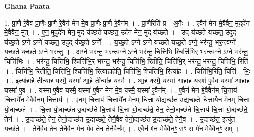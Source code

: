 \documentclass[17pt]{extarticle}
\begin{document}
\textbf{Ghana Paata } \newline

1. प्रा॒णै रे॒वैव प्रा॒णैः प्रा॒णै रे॒वैन॑ मेन मे॒व प्रा॒णैः प्रा॒णै रे॒वैन᳚म् । . प्रा॒णैरिति॑ प्र - अ॒नैः । . ए॒वैन॑ मेन मे॒वैवैन॒ मुदुदे॑न मे॒वैवैन॒ मुत् । . ए॒न॒ मुदुदे॑न मेन॒ मुद् य॑च्छते यच्छत॒ उदे॑न मेन॒ मुद् य॑च्छते । . उद् य॑च्छते यच्छत॒ उदुद् य॑च्छ॒ते ऽग्ने ऽग्ने॑ यच्छत॒ उदुद् य॑च्छ॒ते ऽग्ने᳚ । . य॒च्छ॒ते ऽग्ने ऽग्ने॑ यच्छते यच्छ॒ते ऽग्ने॒ भर॑न्तु॒ भर॒न्त्वग्ने॑ यच्छते यच्छ॒ते ऽग्ने॒ भर॑न्तु । . अग्ने॒ भर॑न्तु॒ भर॒न्त्वग्ने ऽग्ने॒ भर॑न्तु॒ चित्ति॑भि॒ श्चित्ति॑भि॒र् भर॒न्त्वग्ने ऽग्ने॒ भर॑न्तु॒ चित्ति॑भिः । . भर॑न्तु॒ चित्ति॑भि॒ श्चित्ति॑भि॒र् भर॑न्तु॒ भर॑न्तु॒ चित्ति॑भि॒ रितीति॒ चित्ति॑भि॒र् भर॑न्तु॒ भर॑न्तु॒ चित्ति॑भि॒ रिति॑ । . चित्ति॑भि॒ रितीति॒ चित्ति॑भि॒ श्चित्ति॑भि॒ रित्या॑हा॒हेति॒ चित्ति॑भि॒ श्चित्ति॑भि॒ रित्या॑ह । . चित्ति॑भि॒रिति॒ चित्ति॑ - भिः॒ । . इत्या॑हा॒हे तीत्या॑ह॒ यस्मै॒ यस्मा॑ आ॒हे तीत्या॑ह॒ यस्मै᳚ । . आ॒ह॒ यस्मै॒ यस्मा॑ आहाह॒ यस्मा॑ ए॒वैव यस्मा॑ आहाह॒ यस्मा॑ ए॒व । . यस्मा॑ ए॒वैव यस्मै॒ यस्मा॑ ए॒वैन॑ मेन मे॒व यस्मै॒ यस्मा॑ ए॒वैन᳚म् । . ए॒वैन॑ मेन मे॒वैवैन॑म् चि॒त्ताय॑ चि॒त्तायै॑न मे॒वैवैन॑म् चि॒त्ताय॑ । . ए॒न॒म् चि॒त्ताय॑ चि॒त्तायै॑न मेनम् चि॒त्ता यो॒द्यच्छ॑त उ॒द्यच्छ॑ते चि॒त्तायै॑न मेनम् चि॒त्ता यो॒द्यच्छ॑ते । . चि॒त्ता यो॒द्यच्छ॑त उ॒द्यच्छ॑ते चि॒त्ताय॑ चि॒त्ता यो॒द्यच्छ॑ते॒ तेन॒ तेनो॒द्यच्छ॑ते चि॒त्ताय॑ चि॒त्ता यो॒द्यच्छ॑ते॒ तेन॑ । . उ॒द्यच्छ॑ते॒ तेन॒ तेनो॒द्यच्छ॑त उ॒द्यच्छ॑ते॒ तेनै॒वैव तेनो॒द्यच्छ॑त उ॒द्यच्छ॑ते॒ तेनै॒व । . उ॒द्यच्छ॑त॒ इत्यु॑त् - यच्छ॑ते । . तेनै॒वैव तेन॒ तेनै॒वैन॑ मेन मे॒व तेन॒ तेनै॒वैन᳚म् । . ए॒वैन॑ मेन मे॒वैवैनꣳ॒॒ सꣳ स मे॑न मे॒वैवैनꣳ॒॒ सम् । \newline
\end{document}
